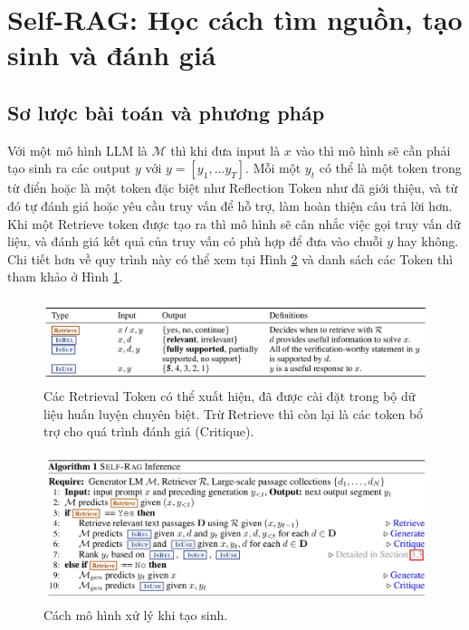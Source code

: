 \documentclass{article}
\begin{document}
\section{Self-RAG: Học cách tìm nguồn, tạo sinh và đánh giá}

\subsection{Sơ lược bài toán và phương pháp}
Với một mô hình LLM là $\mathcal{M}$ thì khi đưa input là $x$ vào thì mô hình sẽ cần phải tạo sinh ra các output $y$ với $y = [y_1,...y_T]$. Mỗi một $y_t$ có thể là một token trong từ điển hoặc là một token đặc biệt như Reflection Token như đã giới thiệu, và từ đó tự đánh giá hoặc yêu cầu truy vấn để hỗ trợ, làm hoàn thiện câu trả lời hơn. Khi một Retrieve token được tạo ra thì mô hình sẽ cân nhắc việc gọi truy vấn dữ liệu, và đánh giá kết quả của truy vấn có phù hợp để đưa vào chuỗi $y$ hay không. Chi tiết hơn về quy trình này có thể xem tại Hình \ref{fig:self_rag_pseudo_code} và danh sách các Token thì tham khảo ở Hình \ref{fig:reflection_token_explanation}. 

\begin{figure} 
    \centering
    \includegraphics[scale = 0.2]{reflection_token_explanation.jpeg}
    \caption{Các Retrieval Token có thể xuất hiện, đã được cài đặt trong bộ dữ liệu huấn luyện chuyên biệt. Trừ Retrieve thì còn lại là các token bổ trợ cho quá trình đánh giá (Critique). }
    \label{fig:reflection_token_explanation}
\end{figure}

\begin{figure} 
    \centering
    \includegraphics[scale = 0.15]{self_rag_pseudo_code.jpeg}
    \caption{Cách mô hình xử lý khi tạo sinh.}
    \label{fig:self_rag_pseudo_code}
\end{figure}
\end{document}
